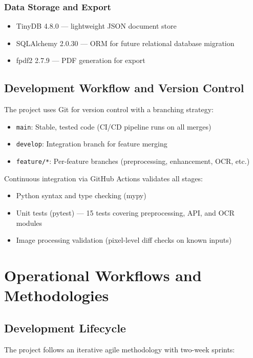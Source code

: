 \subsubsection{Data Storage and Export}
\begin{itemize}
	\item TinyDB 4.8.0 — lightweight JSON document store
	\item SQLAlchemy 2.0.30 — ORM for future relational database migration
	\item fpdf2 2.7.9 — PDF generation for export
\end{itemize}

\subsection{Development Workflow and Version Control}

The project uses Git for version control with a branching strategy:
\begin{itemize}
	\item \texttt{main}: Stable, tested code (CI/CD pipeline runs on all merges)
	\item \texttt{develop}: Integration branch for feature merging
	\item \texttt{feature/*}: Per-feature branches (preprocessing, enhancement, OCR, etc.)
\end{itemize}

Continuous integration via GitHub Actions validates all stages:
\begin{itemize}
	\item Python syntax and type checking (mypy)
	\item Unit tests (pytest) — 15 tests covering preprocessing, API, and OCR modules
	\item Image processing validation (pixel-level diff checks on known inputs)
\end{itemize}

\section{Operational Workflows and Methodologies}

\subsection{Development Lifecycle}

The project follows an iterative agile methodology with two-week sprints:

